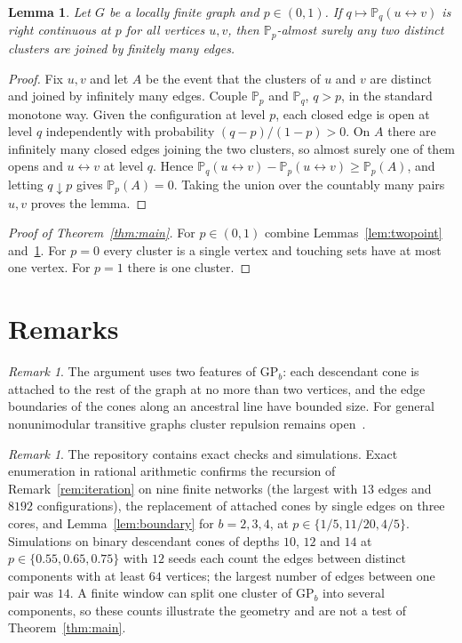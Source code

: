 \documentclass[11pt]{amsart}
\newtheorem{lemma}[theorem]{Lemma}
\theoremstyle{remark}
\newtheorem{remark}[theorem]{Remark}
\newcommand{\PP}{\mathbb{P}}
\newcommand{\GP}{\mathrm{GP}_b}
\begin{document}
\begin{lemma}\label{lem:sprinkle}
Let $G$ be a locally finite graph and $p\in(0,1)$. If $q\mapsto\PP_q(u\leftrightarrow v)$ is right continuous at $p$
for all vertices $u,v$, then $\PP_p$-almost surely any two distinct clusters are joined by finitely many edges.
\end{lemma}

\begin{proof}
Fix $u,v$ and let $A$ be the event that the clusters of $u$ and $v$ are distinct and joined by infinitely many edges.
Couple $\PP_p$ and $\PP_q$, $q>p$, in the standard monotone way. Given the configuration at level $p$, each closed edge
is open at level $q$ independently with probability $(q-p)/(1-p)>0$. On $A$ there are infinitely many closed edges
joining the two clusters, so almost surely one of them opens and $u\leftrightarrow v$ at level $q$. Hence
$\PP_q(u\leftrightarrow v)-\PP_p(u\leftrightarrow v)\ge\PP_p(A)$, and letting $q\downarrow p$ gives $\PP_p(A)=0$. Taking
the union over the countably many pairs $u,v$ proves the lemma.
\end{proof}

\begin{proof}[Proof of Theorem~\ref{thm:main}]
For $p\in(0,1)$ combine Lemmas~\ref{lem:twopoint} and~\ref{lem:sprinkle}. For $p=0$ every cluster is a single vertex
and touching sets have at most one vertex. For $p=1$ there is one cluster.
\end{proof}

\section{Remarks}\label{sec:remarks}

\begin{remark}
The argument uses two features of $\GP$: each descendant cone is attached to the rest of the graph at no more than two
vertices, and the edge boundaries of the cones along an ancestral line have bounded size. For general nonunimodular
transitive graphs cluster repulsion remains open~\cite[Question~1.1]{BCRTT}.
\end{remark}

\begin{remark}\label{rem:sims}
The repository contains exact checks and simulations. Exact enumeration in rational arithmetic confirms the recursion
of Remark~\ref{rem:iteration} on nine finite networks (the largest with $13$ edges and $8192$ configurations), the
replacement of attached cones by single edges on three cores, and Lemma~\ref{lem:boundary} for $b=2,3,4$, at
$p\in\{1/5,11/20,4/5\}$. Simulations on binary descendant cones of depths $10$, $12$ and $14$ at $p\in\{0.55,0.65,0.75\}$
with $12$ seeds each count the edges between distinct components with at least $64$ vertices; the largest number of
edges between one pair was $14$. A finite window can split one cluster of $\GP$ into several components, so these counts
illustrate the geometry and are not a test of Theorem~\ref{thm:main}.
\end{remark}
\end{document}
